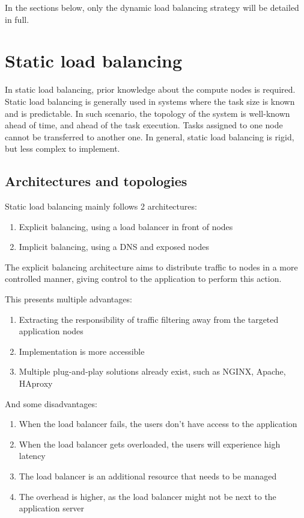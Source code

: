 \documentclass[conference]{IEEEtran}
\begin{document}
    In the sections below, only the dynamic load balancing strategy will be detailed in full.

\section{Static load balancing}
    In static load balancing, prior knowledge about the compute nodes is required. Static load balancing is generally used
in systems where the task size is known and is predictable. In such scenario, the topology of the system is well-known ahead
of time, and ahead of the task execution. Tasks assigned to one node cannot be transferred to another one.
In general, static load balancing is rigid, but less complex to implement.

\subsection{Architectures and topologies}
    Static load balancing mainly follows 2 architectures:

    \begin{enumerate}
        \item Explicit balancing, using a load balancer in front of nodes
        \item Implicit balancing, using a DNS and exposed nodes
    \end{enumerate}

    The explicit balancing architecture aims to distribute traffic to nodes in a more controlled manner, giving
control to the application to perform this action.

    This presents multiple advantages:

    \begin{enumerate}
        \item Extracting the responsibility of traffic filtering away from the targeted application nodes
        \item Implementation is more accessible
        \item Multiple plug-and-play solutions already exist, such as NGINX, Apache, HAproxy
    \end{enumerate}

    And some disadvantages:

    \begin{enumerate}
        \item When the load balancer fails, the users don't have access to the application
        \item When the load balancer gets overloaded, the users will experience high latency
        \item The load balancer is an additional resource that needs to be managed
        \item The overhead is higher, as the load balancer might not be next to the application server
    \end{enumerate}
    
\end{document}
